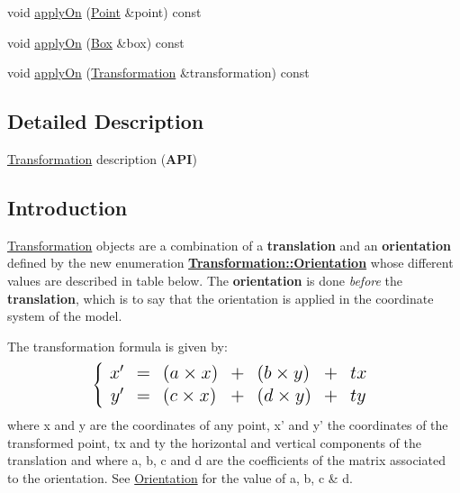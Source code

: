 \begin{DoxyCompactItemize}
\item 
void \hyperlink{classHurricane_1_1Transformation_a2685c930e51d3797d8cba85a2880c2ca}{apply\-On} (\hyperlink{classHurricane_1_1Point}{Point} \&point) const 
\item 
void \hyperlink{classHurricane_1_1Transformation_ad2b0f5be08f08356df9c3f85eebfde3d}{apply\-On} (\hyperlink{classHurricane_1_1Box}{Box} \&box) const 
\item 
void \hyperlink{classHurricane_1_1Transformation_a26834b23ca6df78b59f501acef0eba70}{apply\-On} (\hyperlink{classHurricane_1_1Transformation}{Transformation} \&transformation) const 
\end{DoxyCompactItemize}


\subsection{Detailed Description}
\hyperlink{classHurricane_1_1Transformation}{Transformation} description ({\bfseries A\-P\-I}) 

\hypertarget{classHurricane_1_1Transformation_secTransformationIntro}{}\subsection{Introduction}\label{classHurricane_1_1Transformation_secTransformationIntro}
\hyperlink{classHurricane_1_1Transformation}{Transformation} objects are a combination of a {\bfseries translation} and an {\bfseries orientation} defined by the new enumeration {\bfseries \hyperlink{classHurricane_1_1Transformation_1_1Orientation}{Transformation\-::\-Orientation}} whose different values are described in table below. The {\bfseries orientation} is done {\itshape before} the {\bfseries translation}, which is to say that the orientation is applied in the coordinate system of the model.

The transformation formula is given by\-: \[ \Large \left \{ \begin{array}{r c l l l l l} x' & = & (a \times x) & + & (b \times y) & + & tx \\ y' & = & (c \times x) & + & (d \times y) & + & ty \end{array} \right . \] where x and y are the coordinates of any point, x' and y' the coordinates of the transformed point, tx and ty the horizontal and vertical components of the translation and where a, b, c and d are the coefficients of the matrix associated to the orientation. See \hyperlink{classHurricane_1_1Transformation_1_1Orientation}{Orientation} for the value of a, b, c \& d.

